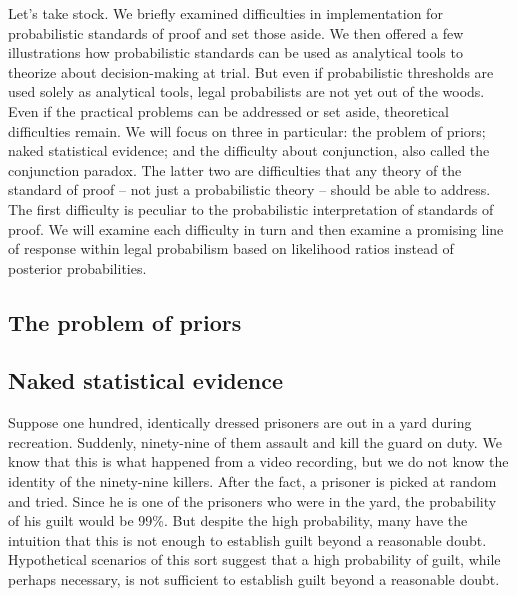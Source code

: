 \documentclass[10pt,dvipsnames,enabledeprecatedfontcommands]{scrartcl}
\begin{document}
Let's take stock. We briefly examined difficulties in implementation for
probabilistic standards of proof and set those aside. We then offered a
few illustrations how probabilistic standards can be used as analytical
tools to theorize about decision-making at trial. But even if
probabilistic thresholds are used solely as analytical tools, legal
probabilists are not yet out of the woods. Even if the practical
problems can be addressed or set aside, theoretical difficulties remain.
We will focus on three in particular: the problem of priors; naked
statistical evidence; and the difficulty about conjunction, also called
the conjunction paradox. The latter two are difficulties that any theory
of the standard of proof -- not just a probabilistic theory -- should be
able to address. The first difficulty is peculiar to the probabilistic
interpretation of standards of proof. We will examine each difficulty in
turn and then examine a promising line of response within legal
probabilism based on likelihood ratios instead of posterior
probabilities.

\subsection{The problem of priors}\label{the-problem-of-priors}

\subsection{Naked statistical
evidence}\label{naked-statistical-evidence}

Suppose one hundred, identically dressed prisoners are out in a yard
during recreation. Suddenly, ninety-nine of them assault and kill the
guard on duty. We know that this is what happened from a video
recording, but we do not know the identity of the ninety-nine killers.
After the fact, a prisoner is picked at random and tried. Since he is
one of the prisoners who were in the yard, the probability of his guilt
would be 99\%. But despite the high probability, many have the intuition
that this is not enough to establish guilt beyond a reasonable doubt.
Hypothetical scenarios of this sort suggest that a high probability of
guilt, while perhaps necessary, is not sufficient to establish guilt
beyond a reasonable doubt.
\end{document}
